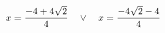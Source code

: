 \documentclass[preview]{standalone}
\begin{document}
\begin{align*}
\special{dvisvgm:raw <g id='unique000'>}x=\frac{-4 + 4 \sqrt{2}}{4} \quad \lor \quad x=\frac{- 4 \sqrt{2} - 4}{4}\special{dvisvgm:raw </g>}
\end{align*}
\end{document}
